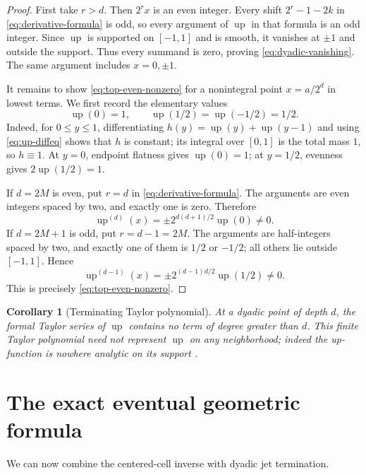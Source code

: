 \documentclass[11pt]{article}
\newtheorem{corollary}[theorem]{Corollary}
\newcommand{\upf}{\operatorname{up}}
\begin{document}
\begin{proof}
First take \(r>d\).  Then \(2^r x\) is an even integer.  Every shift
\(2^r-1-2k\) in \cref{eq:derivative-formula} is odd, so every argument of
\(\upf\) in that formula is an odd integer.  Since \(\upf\) is supported on
\([-1,1]\) and is smooth, it vanishes at \(\pm1\) and outside the support.
Thus every summand is zero, proving \cref{eq:dyadic-vanishing}.  The same
argument includes \(x=0,\pm1\).

It remains to show \cref{eq:top-even-nonzero} for a nonintegral point
\(x=a/2^d\) in lowest terms.  We first record the elementary values
\begin{equation}\label{eq:up-special-values}
 \upf(0)=1,
 \qquad
 \upf(1/2)=\upf(-1/2)=1/2.
\end{equation}
Indeed, for \(0\le y\le1\), differentiating
\(h(y)=\upf(y)+\upf(y-1)\) and using \cref{eq:up-diffeq} shows that \(h\) is
constant; its integral over \([0,1]\) is the total mass \(1\), so \(h\equiv1\).
At \(y=0\), endpoint flatness gives \(\upf(0)=1\); at \(y=1/2\), evenness gives
\(2\upf(1/2)=1\).

If \(d=2M\) is even, put \(r=d\) in \cref{eq:derivative-formula}.  The arguments
are even integers spaced by two, and exactly one is zero.  Therefore
\[
 \upf^{(d)}(x)=\pm2^{d(d+1)/2}\upf(0)\ne0.
\]
If \(d=2M+1\) is odd, put \(r=d-1=2M\).  The arguments are half-integers
spaced by two, and exactly one of them is \(1/2\) or \(-1/2\); all others lie
outside \([-1,1]\).  Hence
\[
 \upf^{(d-1)}(x)=\pm2^{(d-1)d/2}\upf(1/2)\ne0.
\]
This is precisely \cref{eq:top-even-nonzero}.
\end{proof}

\begin{corollary}[Terminating Taylor polynomial]\label{cor:taylor-terminates}
At a dyadic point of depth \(d\), the formal Taylor series of \(\upf\) contains
no term of degree greater than \(d\).  This finite Taylor polynomial need not
represent \(\upf\) on any neighborhood; indeed the up-function is nowhere
analytic on its support \cite{Arias1982}.
\end{corollary}

\section{The exact eventual geometric formula}

We can now combine the centered-cell inverse with dyadic jet termination.
\end{document}
